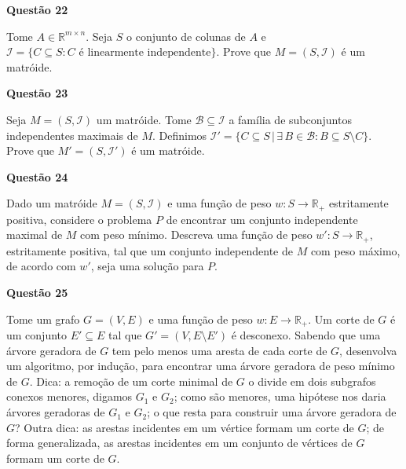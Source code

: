 \documentclass[]{article}
\begin{document}
\vspace{\baselineskip}

\textbf{Questão 22}

Tome $A \in \mathbb{R}^{m \times n}$.  Seja $S$ o conjunto de colunas
de $A$ e
$\mathcal{I} = \{C \subseteq S : C \text{ é linearmente
  independente}\}$.  Prove que $M = (S, \mathcal{I})$ é um matróide.

\vspace{\baselineskip}

\textbf{Questão 23}

Seja $M = (S, \mathcal{I})$ um matróide.  Tome
$\mathcal{B} \subseteq \mathcal{I}$ a família de subconjuntos
independentes maximais de $M$.  Definimos
$\mathcal{I}' = \{C \subseteq S \,|\, \exists\, B \in \mathcal{B} : B
\subseteq S \setminus C\}$.  Prove que $M' = (S, \mathcal{I}')$ é um
matróide.

\vspace{\baselineskip}

\textbf{Questão 24}

Dado um matróide $M = (S, \mathcal{I})$ e uma função de peso
$w : S \to \mathbb{R}_+$ estritamente positiva, considere o problema
$P$ de encontrar um conjunto independente maximal de $M$ com peso
mínimo.  Descreva uma função de peso $w' : S \to \mathbb{R}_+$,
estritamente positiva, tal que um conjunto independente de $M$ com
peso máximo, de acordo com $w'$, seja uma solução para $P$.

\vspace{\baselineskip}

\textbf{Questão 25}

Tome um grafo $G = (V, E)$ e uma função de peso
$w : E \to \mathbb{R}_+$.  Um corte de $G$ é um conjunto
$E' \subseteq E$ tal que $G' = (V, E \setminus E')$ é desconexo.
Sabendo que uma árvore geradora de $G$ tem pelo menos uma aresta de
cada corte de $G$, desenvolva um algoritmo, por indução, para
encontrar uma árvore geradora de peso mínimo de $G$.  Dica: a remoção
de um corte minimal de $G$ o divide em dois subgrafos conexos menores,
digamos $G_1$ e $G_2$; como são menores, uma hipótese nos daria
árvores geradoras de $G_1$ e $G_2$; o que resta para construir uma
árvore geradora de $G$?  Outra dica: as arestas incidentes em um
vértice formam um corte de $G$; de forma generalizada, as arestas
incidentes em um conjunto de vértices de $G$ formam um corte de $G$.
\end{document}
